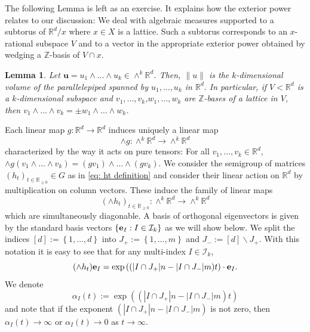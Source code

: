\documentclass[reqno,11pt, twoside]{amsart}
\theoremstyle{plain}
\newtheorem{lem}[thm]{Lemma}
\theoremstyle{definition}
\theoremstyle{definition}
\theoremstyle{remark}
\numberwithin{equation}{section}
\newcommand{\sm}{\smallsetminus}
\newcommand{\R}{{\mathbb{R}}}
\newcommand{\ve}{{\bf e}}
\newcommand{\al}{\alpha}
\newcommand{\cI}{\mathcal{I}}
\newcommand{\bR}{\mathbb{R}}
\newcommand{\bZ}{\mathbb{Z}}
\newcommand\norm[1]{\|#1\|}
\newcommand\seta[1]{\left\{#1\right\}}
\newcommand\pa[1]{\left(#1\right)}
\newcommand\av[1]{|#1|}
\newcommand\mb[1]{\mathbf{#1}}
\newcommand\br[1]{\left[#1\right]}
\begin{document}
    The following Lemma is left as an exercise. It explains how the exterior power relates to our discussion: We deal with algebraic measures supported to a subtorus of $\bR^d/x$ where $x\in X$ is a lattice. Such a subtorus corresponds to an $x$-rational subspace $V$ and to a vector in 
    the appropriate exterior power obtained by wedging a $\bZ$-basis of $V\cap x$.
    \begin{lem}
        \label{lem: norm of pure tensors}
        Let $\mb{u}=u_1\wedge\dots\wedge u_k\in \wedge^k\bR^d$. Then, $\norm{u}$ is the $k$-dimensional volume of the parallelepiped spanned 
        by $u_1,\dots, u_k$ in $\bR^d.$ In particular, if $V<\bR^d$ is a $k$-dimensional subspace and $v_1,\dots, v_k$,$w_1,\dots ,w_k$ are $\bZ$-bases of a lattice in $V$, then $v_1\wedge\dots \wedge v_k = \pm w_1\wedge\dots \wedge w_k$.  
    \end{lem}
    Each linear map $g: \R^d \to \R^d$ induces uniquely a linear map
    \begin{equation*}
        \wedge g : \wedge^k \R^d \to \wedge^k \R^d
    \end{equation*}
    characterized by the way it acts on pure tensors: For all $v_1,\dots,v_k\in \bR^d$, $\wedge g(v_1\wedge\dots \wedge v_k) = (gv_1)\wedge\dots\wedge(gv_k)$. We consider the semigroup of matrices $(h_t)_{t \in \R_{\geq 0}} \in G$ as in \eqref{eq: ht definition} and consider their linear action on $\R^d$ by multiplication on column vectors.
    These induce the family of linear maps 
    \begin{equation*}
        (\wedge h_t)_{t \in \R_{\geq 0}} : \wedge^k \R^d \to \wedge^k \R^d
    \end{equation*}
    which are simultaneously diagonable. A basis of orthogonal eigenvectors is given by the standard basis vectors $\seta{\ve_I:I\in \cI_k}$ as we will show below.
    We split the indices $\br{d}:=\seta{1,\dots,d}$ into $J_+:=\seta{1,\dots, m}$ and $J_-:=\br{d}\sm J_+.$ With this notation it is easy to see that for any multi-index $I\in \cI_k$,
    \begin{equation}\label{eq: the weights}
    (\wedge h_t)\ve_I = \exp\pa{(\av{I\cap J_+}n - \av{I\cap J_-}m)t}\cdot \ve_I.
    \end{equation}
    We denote 
    \begin{equation}
        \label{eq: the weights2}
        \al_I(t):=\exp\pa{(\av{I\cap J_+}n - \av{I\cap J_-}m)t}
    \end{equation}
    and note that if the exponent $(\av{I\cap J_+}n - \av{I\cap J_-}m)$ is not zero, then $\al_I(t)\to \infty$ or $\al_I(t)\to 0$ as $t\to\infty$. 
\end{document}
